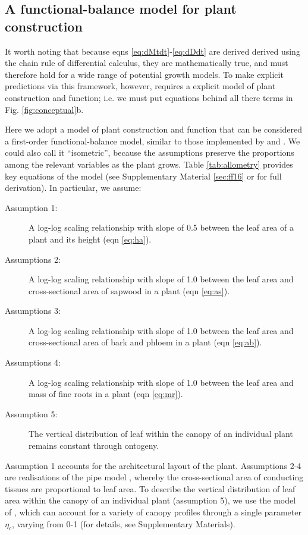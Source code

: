 \documentclass[a4paper,11pt]{article}
\begin{document}
\subsection{A functional-balance model for plant construction}

It worth noting that because eqns \ref{eq:dMtdt}-\ref{eq:dDdt} are derived derived using the chain rule of differential calculus, they are mathematically true, and must therefore hold for a wide range of potential growth models. To make explicit predictions via this framework, however, requires a explicit model of plant construction and function; i.e. we must put equations behind all there terms in Fig. \ref{fig:conceptual}b.

Here we adopt a model of plant construction and function that can be considered a first-order functional-balance model, similar to those implemented by \citet{Makela-1997} and \citet{Moorcroft-2001}. We could also call it ``isometric'', because the assumptions preserve the proportions among the relevant variables as the plant grows. Table \ref{tab:allometry} provides key equations of the model (see Supplementary Material \ref{sec:ff16} or \citet{Falster-2016} for full derivation). In particular, we assume:
\begin{description}
\item[Assumption 1:] A log-log scaling relationship with slope of 0.5 between the leaf area of a plant and its height (eqn \ref{eq:ha}).
\item[Assumptions 2:] A log-log scaling relationship with slope of 1.0 between the leaf area and cross-sectional area of sapwood in a plant (eqn \ref{eq:as}).
\item[Assumptions 3:] A log-log scaling relationship with slope of 1.0 between the leaf area and cross-sectional area of bark and phloem in a plant (eqn \ref{eq:ab}).
\item[Assumptions 4:] A log-log scaling relationship with slope of 1.0 between the leaf area and mass of fine roots in a plant (eqn \ref{eq:mr}).
\item[Assumption 5:] The vertical distribution of leaf within the canopy of an individual plant remains constant through ontogeny.
\end{description}
Assumption 1 accounts for the architectural layout of the plant. Assumptions 2-4 are realisations of the pipe model \citep{Shinozaki-1964}, whereby the cross-sectional area of conducting tissues are proportional to leaf area. To describe the vertical distribution of leaf area within the canopy of an individual plant (assumption 5), we use the model of \citet{Yokozawa-1995}, which can account for a variety of canopy profiles through a single parameter $\eta_c$, varying from 0-1 (for details, see Supplementary Materials).
\end{document}
